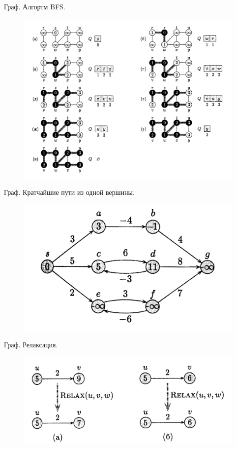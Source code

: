 \documentclass[10pt]{beamer}
\begin{document}
\begin{frame}{Граф. Алгортм BFS.}
\begin{figure}
\centerline{\includegraphics[width=1.0\linewidth]{images/bfs_graph.png}}
\end{figure}
\end{frame}




\begin{frame}{Граф. Кратчайшие пути из одной вершины.}
\begin{figure}
\centerline{\includegraphics[width=1.0\linewidth]{images/closest1.png}}
\end{figure}
\end{frame}

\begin{frame}{Граф. Релаксация.}
\begin{figure}
\centerline{\includegraphics[width=1.0\linewidth]{images/relax.png}}
\end{figure}
\end{frame}
\end{document}
